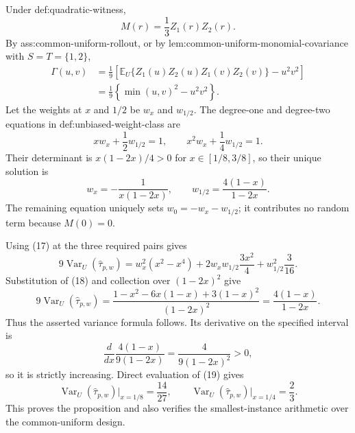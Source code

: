 Under def:quadratic-witness,
\[
M(r)=\frac13 Z_1(r)Z_2(r).
\]
By ass:common-uniform-rollout, or by lem:common-uniform-monomial-covariance with \(S=T=\{1,2\}\),
\[
\begin{aligned}
\Gamma(u,v)
&=\frac19\left[\mathbb E_U\{Z_1(u)Z_2(u)Z_1(v)Z_2(v)\}-u^2v^2\right]\\
&=\frac19\left\{\min(u,v)^2-u^2v^2\right\}.
\end{aligned}
\tag{17}
\]
Let the weights at \(x\) and \(1/2\) be \(w_x\) and \(w_{1/2}\).  The degree-one and degree-two equations in def:unbiased-weight-class are
\[
xw_x+\frac12w_{1/2}=1,
\qquad
x^2w_x+\frac14w_{1/2}=1.
\]
Their determinant is \(x(1-2x)/4>0\) for \(x\in[1/8,3/8]\), so their unique solution is
\[
w_x=-\frac1{x(1-2x)},
\qquad
w_{1/2}=\frac{4(1-x)}{1-2x}.
\tag{18}
\]
The remaining equation uniquely sets \(w_0=-w_x-w_{1/2}\); it contributes no random term because \(M(0)=0\).

Using (17) at the three required pairs gives
\[
9\operatorname{Var}_U(\widehat\tau_{p,w})
=w_x^2(x^2-x^4)
+2w_xw_{1/2}\frac{3x^2}{4}
+w_{1/2}^2\frac3{16}.
\]
Substitution of (18) and collection over \((1-2x)^2\) give
\[
9\operatorname{Var}_U(\widehat\tau_{p,w})
=\frac{1-x^2-6x(1-x)+3(1-x)^2}{(1-2x)^2}
=\frac{4(1-x)}{1-2x}.
\tag{19}
\]
Thus the asserted variance formula follows.  Its derivative on the specified interval is
\[
\frac{d}{dx}\frac{4(1-x)}{9(1-2x)}
=\frac4{9(1-2x)^2}>0,
\]
so it is strictly increasing.  Direct evaluation of (19) gives
\[
\operatorname{Var}_U(\widehat\tau_{p,w})\big|_{x=1/8}=\frac{14}{27},
\qquad
\operatorname{Var}_U(\widehat\tau_{p,w})\big|_{x=1/4}=\frac23.
\]
This proves the proposition and also verifies the smallest-instance arithmetic over the common-uniform design.